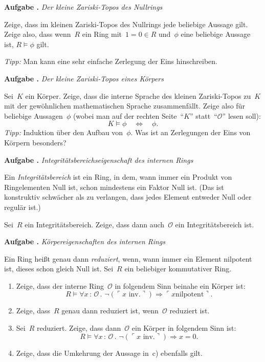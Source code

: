 \documentclass[a4paper,ngerman,12pt]{scrartcl}
\theoremstyle{definition}
\theoremstyle{plain}
\theoremstyle{remark}
\renewcommand{\O}{\mathcal{O}}
\renewcommand{\_}{\mathpunct{.}\,}
\newcommand{\?}{\,{:}\,}
\newcommand{\speak}[1]{\ulcorner\text{#1}\urcorner}
\newlength{\aufgabenskip}
\newcounter{aufgabennummer}
\newenvironment{aufgabe}[1]{
  \addtocounter{aufgabennummer}{1}
  \textbf{Aufgabe \theaufgabennummer{}.} \emph{#1} \par
}{\vspace{\aufgabenskip}}
\begin{document}
\begin{aufgabe}{Der kleine Zariski-Topos des Nullrings}
Zeige, dass im kleinen Zariski-Topos des Nullrings jede beliebige Aussage gilt.
Zeige also, dass wenn~$R$ ein Ring mit~$1 = 0 \in R$ und~$\phi$ eine beliebige
Aussage ist, $R \models \phi$ gilt.

\emph{Tipp:} Man kann eine sehr einfache Zerlegung der Eins hinschreiben.
\end{aufgabe}

\begin{aufgabe}{Der kleine Zariski-Topos eines Körpers}
Sei~$K$ ein Körper. Zeige, dass die interne Sprache des kleinen Zariski-Topos
zu~$K$ mit der gewöhnlichen mathematischen Sprache zusammenfällt. Zeige also
für beliebige Aussagen~$\phi$ (wobei man auf der rechten Seite~"`$K$"'
statt~"`$\O$"' lesen soll):
\[ K \models \phi \quad\Longleftrightarrow\quad \phi. \]
\emph{Tipp:} Induktion über den Aufbau von~$\phi$. Was ist an Zerlegungen der
Eins von Körpern besonders?
\end{aufgabe}

\begin{aufgabe}{Integritätsbereichseigenschaft des internen Rings}
Ein \emph{Integritätsbereich} ist ein Ring, in dem, wann immer ein Produkt von
Ringelementen Null ist, schon mindestens ein Faktor Null ist. (Das ist
konstruktiv schwächer als zu verlangen, dass jedes Element entweder Null oder
regulär ist.)

Sei~$R$ ein Integritätsbereich. Zeige, dass dann auch~$\O$ ein
Integritätsbereich ist.
\end{aufgabe}

\enlargethispage{1.0cm}
\begin{aufgabe}{Körpereigenschaften des internen Rings}
Ein Ring heißt genau dann \emph{reduziert}, wenn, wann immer ein Element
nilpotent ist, dieses schon gleich Null ist.
Sei~$R$ ein beliebiger kommutativer Ring.
\begin{enumerate}
\item Zeige, dass der interne Ring~$\O$ in folgendem Sinn beinahe ein Körper
ist:
\[ R \models \forall x\?\O\_ \neg(\speak{$x$ inv.}) \Rightarrow \speak{$x$
nilpotent}. \]
\vspace*{-1.8em}%
\item Zeige, dass~$R$ genau dann reduziert ist, wenn~$\O$ reduziert ist.
\item Sei~$R$ reduziert. Zeige, dass dann~$\O$ ein Körper in folgendem Sinn
ist:
\[ R \models \forall x\?\O\_ \neg(\speak{$x$ inv.}) \Rightarrow x = 0. \]
\vspace*{-1.8em}%
\item Zeige, dass die Umkehrung der Aussage in~c) ebenfalls gilt.
\end{enumerate}
\end{aufgabe}
\end{document}
